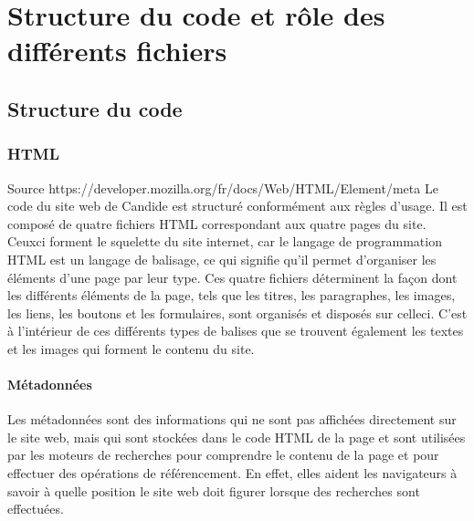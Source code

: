\documentclass[a4,10pt,french]{sphinxmanual}
\begin{document}
\section{Structure du code et rôle des différents fichiers}
\label{\detokenize{chapitre-02:structure-du-code-et-role-des-differents-fichiers}}

\subsection{Structure du code}
\label{\detokenize{chapitre-02:structure-du-code}}

\subsubsection{HTML}
\label{\detokenize{chapitre-02:html}}
\sphinxAtStartPar
Source https://developer.mozilla.org/fr/docs/Web/HTML/Element/meta
Le code du site web de Candide est structuré conformément aux règles d’usage. Il est composé de quatre fichiers HTML correspondant aux quatre pages du site. Ceux\sphinxhyphen{}ci forment le squelette du site internet, car le langage de programmation HTML est un langage de balisage, ce qui signifie qu’il permet d’organiser les éléments d’une page par leur type. Ces quatre fichiers déterminent la façon dont les différents éléments de la page, tels que les titres, les paragraphes, les images, les liens, les boutons et les formulaires, sont organisés et disposés sur celle\sphinxhyphen{}ci. C’est à l’intérieur de ces différents types de balises que se trouvent également les textes et les images qui forment le contenu du site.


\paragraph{Métadonnées}
\label{\detokenize{chapitre-02:metadonnees}}
\sphinxAtStartPar
Les métadonnées sont des informations qui ne sont pas affichées directement sur le site web, mais qui sont stockées dans le code HTML de la page et sont utilisées par les moteurs de recherches pour comprendre le contenu de la page et pour effectuer des opérations de référencement. En effet, elles aident les navigateurs à savoir à quelle position le site web doit figurer lorsque des recherches sont effectuées.
\end{document}
